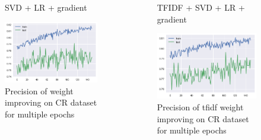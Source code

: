 \documentclass[xcolor={table}]{beamer}
\begin{document}
\begin{frame}{}
    \begin{columns}
                   \begin{figure}[H]
                    \centering
                    \caption*{SVD + LR + gradient}
                    \includegraphics[height=0.4\textheight]{images/CRDataset_grad.png}
                    \caption{Precision of weight improving on CR dataset for multiple epochs}
                \end{figure}

                \begin{figure}[H]
                    \centering
                    \caption*{TFIDF + SVD + LR + gradient}
                    \includegraphics[height=0.4\textheight]{images/CRDataset_tfidf_grad.png}
                    \caption{Precision of tfidf weight improving on CR dataset for multiple epochs}
                \end{figure}
    \end{columns}                
\end{frame} 
\end{document}
